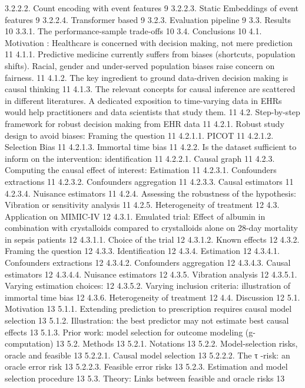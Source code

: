3.2.2.2. Count encoding with event features	9
3.2.2.3. Static Embeddings of event features	9
3.2.2.4. Transformer based	9
3.2.3. Evaluation pipeline	9
3.3. Results	10
3.3.1. The performance-sample trade-offs	10
3.4. Conclusions	10
4.1. Motivation : Healthcare is concerned with decision making, not mere prediction	11
4.1.1. Predictive medicine currently suffers from biases (shortcuts, population shifts). Racial, gender and under-served population biases raise concern on fairness.	11
4.1.2. The key ingredient to ground data-driven decision making is causal thinking	11
4.1.3. The relevant concepts for causal inference are scattered in different literatures. A dedicated exposition to time-varying data in EHRs would help practitioners and data scientists that study them.	11
4.2. Step-by-step framework for robust decision making from EHR data	11
4.2.1. Robust study design to avoid biases: Framing the question	11
4.2.1.1. PICOT	11
4.2.1.2. Selection Bias	11
4.2.1.3. Immortal time bias	11
4.2.2. Is the dataset sufficient to inform on the intervention: identification	11
4.2.2.1. Causal graph	11
4.2.3. Computing the causal effect of interest: Estimation	11
4.2.3.1. Confounders extractions	11
4.2.3.2. Confounders aggregation	11
4.2.3.3. Causal estimators	11
4.2.3.4. Nuisance estimators	11
4.2.4. Assessing the robustness of the hypothesis: Vibration or sensitivity analysis	11
4.2.5. Heterogeneity of treatment	12
4.3. Application on MIMIC-IV	12
4.3.1. Emulated trial: Effect of albumin in combination with crystalloids compared to crystalloids alone on 28-day mortality in sepsis patients	12
4.3.1.1. Choice of the trial	12
4.3.1.2. Known effects	12
4.3.2. Framing the question	12
4.3.3. Identification	12
4.3.4. Estimation	12
4.3.4.1. Confounders extractions	12
4.3.4.2. Confounders aggregation	12
4.3.4.3. Causal estimators	12
4.3.4.4. Nuisance estimators	12
4.3.5. Vibration analysis	12
4.3.5.1. Varying estimation choices:	12
4.3.5.2. Varying inclusion criteria: illustration of immortal time bias	12
4.3.6. Heterogeneity of treatment	12
4.4. Discussion	12
5.1. Motivation	13
5.1.1. Extending prediction to prescription requires causal model selection	13
5.1.2. Illustration: the best predictor may not estimate best causal effects	13
5.1.3. Prior work: model selection for outcome modeling (g-computation)	13
5.2. Methods	13
5.2.1. Notations	13
5.2.2. Model-selection risks, oracle and feasible	13
5.2.2.1. Causal model selection	13
5.2.2.2. The τ -risk: an oracle error risk	13
5.2.2.3. Feasible error risks	13
5.2.3. Estimation and model selection procedure	13
5.3. Theory: Links between feasible and oracle risks	13
